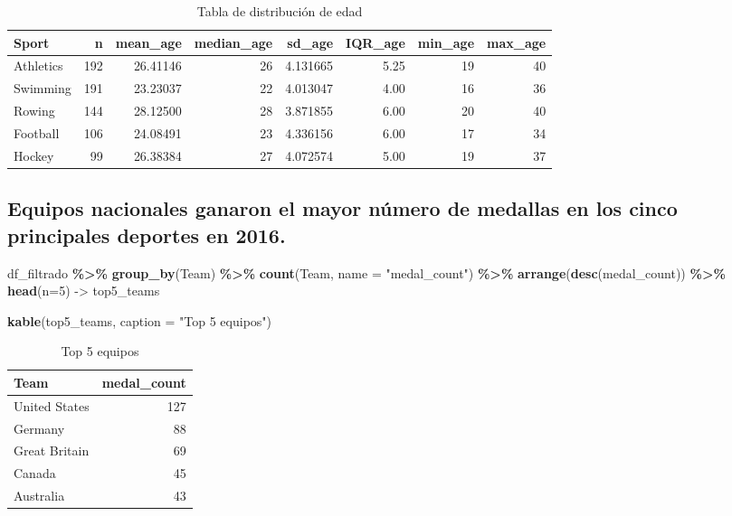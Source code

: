 \documentclass[
]{book}
\newenvironment{Shaded}{\begin{snugshade}}{\end{snugshade}}
\newcommand{\AttributeTok}[1]{\textcolor[rgb]{0.13,0.29,0.53}{#1}}
\newcommand{\DecValTok}[1]{\textcolor[rgb]{0.00,0.00,0.81}{#1}}
\newcommand{\FunctionTok}[1]{\textcolor[rgb]{0.13,0.29,0.53}{\textbf{#1}}}
\newcommand{\NormalTok}[1]{#1}
\newcommand{\OtherTok}[1]{\textcolor[rgb]{0.56,0.35,0.01}{#1}}
\newcommand{\SpecialCharTok}[1]{\textcolor[rgb]{0.81,0.36,0.00}{\textbf{#1}}}
\newcommand{\StringTok}[1]{\textcolor[rgb]{0.31,0.60,0.02}{#1}}
\begin{document}
\begin{table}

\caption{\label{tab:unnamed-chunk-11}Tabla de distribución de edad}
\centering
\begin{tabular}[t]{l|r|r|r|r|r|r|r}
\hline
Sport & n & mean\_age & median\_age & sd\_age & IQR\_age & min\_age & max\_age\\
\hline
Athletics & 192 & 26.41146 & 26 & 4.131665 & 5.25 & 19 & 40\\
\hline
Swimming & 191 & 23.23037 & 22 & 4.013047 & 4.00 & 16 & 36\\
\hline
Rowing & 144 & 28.12500 & 28 & 3.871855 & 6.00 & 20 & 40\\
\hline
Football & 106 & 24.08491 & 23 & 4.336156 & 6.00 & 17 & 34\\
\hline
Hockey & 99 & 26.38384 & 27 & 4.072574 & 5.00 & 19 & 37\\
\hline
\end{tabular}
\end{table}

\subsection*{Equipos nacionales ganaron el mayor número de medallas en los cinco principales deportes en 2016.}\label{equipos-nacionales-ganaron-el-mayor-nuxfamero-de-medallas-en-los-cinco-principales-deportes-en-2016.}

\begin{Shaded}
\begin{Highlighting}[]
\NormalTok{df\_filtrado }\SpecialCharTok{\%\textgreater{}\%}
  \FunctionTok{group\_by}\NormalTok{(Team) }\SpecialCharTok{\%\textgreater{}\%}
  \FunctionTok{count}\NormalTok{(Team, }\AttributeTok{name =} \StringTok{"medal\_count"}\NormalTok{)  }\SpecialCharTok{\%\textgreater{}\%} 
  \FunctionTok{arrange}\NormalTok{(}\FunctionTok{desc}\NormalTok{(medal\_count)) }\SpecialCharTok{\%\textgreater{}\%} 
  \FunctionTok{head}\NormalTok{(}\AttributeTok{n=}\DecValTok{5}\NormalTok{) }\OtherTok{{-}\textgreater{}}\NormalTok{ top5\_teams}

\FunctionTok{kable}\NormalTok{(top5\_teams, }\AttributeTok{caption =} \StringTok{"Top 5 equipos"}\NormalTok{)}
\end{Highlighting}
\end{Shaded}

\begin{table}

\caption{\label{tab:unnamed-chunk-12}Top 5 equipos}
\centering
\begin{tabular}[t]{l|r}
\hline
Team & medal\_count\\
\hline
United States & 127\\
\hline
Germany & 88\\
\hline
Great Britain & 69\\
\hline
Canada & 45\\
\hline
Australia & 43\\
\hline
\end{tabular}
\end{table}
\end{document}
